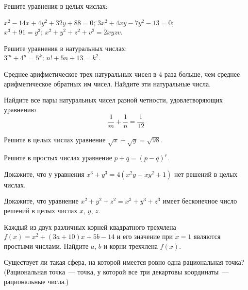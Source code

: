 

\begin{problems}
\item
Решите уравнения в целых числах:
\begin{tabbing}
\sbp $x^2 - 14 x + 4 y^2 + 32 y + 88 = 0$;
\qquad\=
\sbp $3 x^2 + 4 x y - 7 y^2 - 13 = 0$;
\\
\sbp $x^3 + 91 = y^3$;
\qquad\>
\sbp $x^2 + y^2 + z^2 + v^2 = 2 x y z v$.
\end{tabbing}

\item
Решите уравнения в натуральных числах:
\\
\sbp $3^m + 4^n = 5^k$;
\qquad
\sbp $n! + 5 n + 13 = k^2$.

\item
Среднее арифметическое трех натуральных чисел в $4$ раза больше, чем среднее
арифметическое обратных им чисел.
Найдите эти натуральные числа.

\item
Найдите все пары натуральных чисел разной четности, удовлетворяющих уравнению
\[
    \frac{1}{m} + \frac{1}{n} = \frac{1}{12}
\]

\item
Решите в целых числах уравнение $\sqrt{x} + \sqrt{y} = \sqrt{98}$.

\item
Решите в простых числах уравнение $p + q = (p - q)^r$.

\item
Докажите, что у уравнения
$x^3 + y^3 = 4 (x^2 y + x y^2 + 1)$
нет решений в целых числах.

\item
Докажите, что уравнение $x^2 + y^2 + z^2 = x^3 + y^3 + z^3$ имеет бесконечное
число решений в целых числах $x$, $y$, $z$.

\item
Каждый из двух различных корней квадратного трехчлена
$f(x) = x^2 + (3 a + 10) x + 5 b - 14$
и его значение при $x = 1$ являются простыми числами.
Найдите $a$, $b$ и корни трехчлена $f(x)$.

\item
Существует ли такая сфера, на которой имеется ровно одна рациональная точка?
(Рациональная точка~--- точка, у которой все три декартовы координаты~---
рациональные числа.)

\end{problems}

